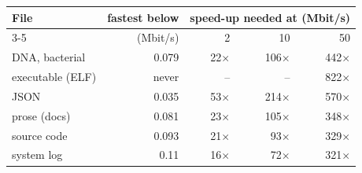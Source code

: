 \begin{tabular}{@{}lrrrr@{}}
\toprule
File & fastest below & \multicolumn{3}{c}{speed-up needed at (Mbit/s)} \\
\cmidrule(l){3-5}
 & (Mbit/s) & 2 & 10 & 50 \\
\midrule
DNA, bacterial & 0.079 & 22$\times$ & 106$\times$ & 442$\times$ \\
executable (ELF) & never & -- & -- & 822$\times$ \\
JSON & 0.035 & 53$\times$ & 214$\times$ & 570$\times$ \\
prose (docs) & 0.081 & 23$\times$ & 105$\times$ & 348$\times$ \\
source code & 0.093 & 21$\times$ & 93$\times$ & 329$\times$ \\
system log & 0.11 & 16$\times$ & 72$\times$ & 321$\times$ \\
\bottomrule
\end{tabular}
